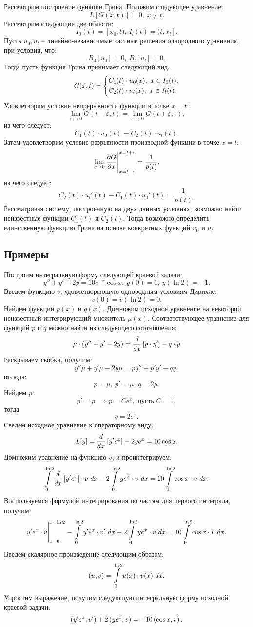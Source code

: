	Рассмотрим построение функции Грина. Положим следующее уравнение:
	\[ L[G(x, t)] = 0, ~ x \neq t. \]
	Рассмотрим следующие две области:
	\[ I_0(t) = [x_0, t), ~ I_l(t) = (t, x_l]. \]
	Пусть $u_0, u_l$ -- линейно-независимые частные решения однородного уравнения, при условии, что:
	\[ B_0[u_0] = 0, ~ B_l[u_l] = 0. \]
	Тогда пусть функция Грина принимает следующий вид:
	\[ G(x, t) = \left\lbrace \begin{aligned} 
		& C_1(t) \cdot u_0(x), ~ x \in I_0(t), \\
		& C_2(t) \cdot u_l(x), ~ x \in I_l(t).
	 \end{aligned} \right. \]
	Удовлетворим условие непрерывности функции в точке $x = t$:
	\[ \lim\limits_{\varepsilon \to 0} G(t - \varepsilon, t) = \lim\limits_{\varepsilon \to 0} G(t + \varepsilon, t), \]
	из чего следует:
	\[ C_1(t) \cdot u_0(t) = C_2(t) \cdot u_l(t). \]
	Затем удовлетворим условие разрывности производной функции в точке $x = t$:
	\[ \lim\limits_{\varepsilon \to 0} \dfrac{\partial G}{\partial x} \Biggl\vert \Biggr._{x = t - \varepsilon}^{x = t + \varepsilon} = \frac{1}{p(t)}, \]
	из чего следует:
	\[ C_2(t) \cdot u_l'(t) - C_1(t) \cdot u_0'(t) = \frac{1}{p(t)}. \]
	Рассматривая систему, построенную на двух данных условиях, возможно найти неизвестные функции $C_1(t)$ и $C_2(t)$. Тогда возможно определить единственную функцию Грина на основе конкретных функций $u_0$ и $u_l$.

	\subsection{Примеры}

		Построим интегральную форму следующей краевой задачи:
		\[ y'' + y' - 2y = 10e^{-x} \cos{x}, ~ y(0) = 1, ~ y(\ln{2}) = -1. \]
		Введем функцию $v$, удовлетворяющую однородным условиям Дирихле:
		\[ v(0) = v(\ln{2}) = 0. \]
		Найдем функции $p(x)$ и $q(x)$. Домножим исходное уравнение на некоторой неизвестный интегрирующий множитель $\mu(x)$. Соответствующее уравнение для функций $p$ и $q$ можно найти из следующего соотношения:
		\[ \mu \cdot \left( y'' + y' - 2y \right) = \dfrac{d }{d x} \left[ p \cdot y' \right] - q \cdot y \]
		Раскрываем скобки, получим:
		\[ y'' \mu + y' \mu - 2y \mu = py'' + p'y' - qy, \]
		отсюда:
		\[ p = \mu, ~ p' = \mu, ~ q = 2 \mu. \]
		Найдем $p$:
		\[ p' = p \implies p = C e^{x}, \text{ пусть } C = 1, \]
		тогда
		\[ q = 2 e^{x}. \]
		Сведем исходное уравнение к операторному виду:
		\[ L[y] = \dfrac{d }{d x} \left[ y' e^x \right] - 2 y e^x = 10 \cos{x}. \]
		Домножим уравнение на функцию $v$, и проинтегрируем:
		\[ \int\limits_{0}^{\ln{2}} \dfrac{d }{d x} \left[ y' e^x \right] \cdot v ~ dx - 2 \int\limits_{0}^{\ln{2}} y e^{x} \cdot v ~ dx = 10 \int\limits_{0}^{\ln{2}} \cos{x} \cdot v ~ dx. \]
		Воспользуемся формулой интегрирования по частям для первого интеграла, получим:
		\[ y' e^{x} \cdot v \Biggl\vert \Biggr._{x = 0}^{x = \ln{2}} - \int\limits_{0}^{\ln{2}} y' e^{x} \cdot v' ~ dx - 2 \int\limits_{0}^{\ln{2}} y e^{x} \cdot v ~ dx = 10 \int\limits_{0}^{\ln{2}} \cos{x} \cdot v ~ dx. \]
		Введем скалярное произведение следующим образом:
		\[ \left( u, v \right) = \int\limits_{0}^{\ln{2}} u(x) \cdot v(x) ~ dx. \]
		Упростим выражение, получим следующую интегральную форму исходной краевой задачи:
		\[ \left( y' e^{x}, v' \right) + 2 \left( y e^{x}, v \right) = - 10 \left( \cos{x}, v \right). \]


